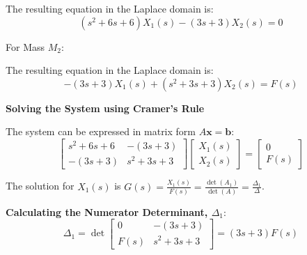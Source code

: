 \documentclass[11pt]{article}
\begin{document}
The resulting equation in the Laplace domain is:
\begin{equation}
(s^2 + 6s + 6)X_1(s) - (3s + 3)X_2(s) = 0 \tag{1}
\end{equation}

\vspace{12pt}
{For Mass $M_2$:}
\begin{figure}[h!]
\centering
{}
\end{figure}

The resulting equation in the Laplace domain is:
\begin{equation}
-(3s + 3)X_1(s) + (s^2 + 3s + 3)X_2(s) = F(s) \tag{2}
\end{equation}

\newpage
\noindent\textbf{Solving the System using Cramer's Rule}
\vspace{12pt}

The system can be expressed in matrix form $A\mathbf{x} = \mathbf{b}$:
$$
\begin{bmatrix}
s^2 + 6s + 6 & -(3s + 3) \\
-(3s + 3) & s^2 + 3s + 3
\end{bmatrix}
\begin{bmatrix}
X_1(s) \\
X_2(s)
\end{bmatrix}
=
\begin{bmatrix}
0 \\
F(s)
\end{bmatrix}
$$

The solution for $X_1(s)$ is $G(s) = \frac{X_1(s)}{F(s)} = \frac{\det(A_1)}{\det(A)} = \frac{\Delta_1}{\Delta}$.

\vspace{12pt}
\noindent\textbf{Calculating the Numerator Determinant, $\Delta_1$}:
$$ \Delta_1 = \det
\begin{bmatrix}
0 & -(3s + 3) \\
F(s) & s^2 + 3s + 3
\end{bmatrix}
= (3s + 3)F(s) $$
\end{document}

